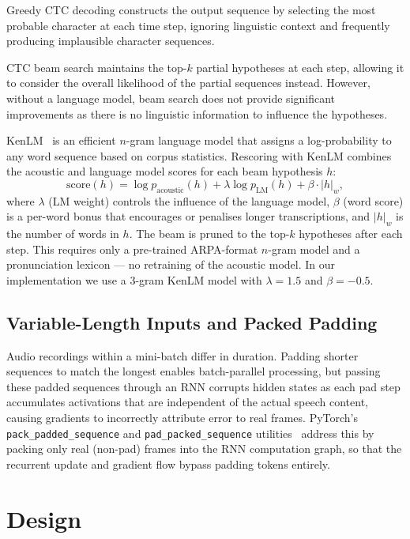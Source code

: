 \documentclass{article}
\begin{document}
Greedy CTC decoding constructs the output sequence by selecting the most probable character at each time step, ignoring linguistic context and frequently producing implausible character sequences.

CTC beam search maintains the top-$k$ partial hypotheses at each step, allowing it to consider the overall likelihood of the partial sequences instead. However, without a language model, beam search does not provide significant improvements as there is no linguistic information to influence the hypotheses.

KenLM~\cite{heafield-2011-kenlm} is an efficient $n$-gram language model that assigns a log-probability to any word sequence based on corpus statistics. Rescoring with KenLM combines the acoustic and language model scores for each beam hypothesis $h$:
\begin{equation}
    \text{score}(h) = \log p_\text{acoustic}(h) + \lambda \log p_\text{LM}(h) + \beta \cdot |h|_w,
    \label{eq:lm_decode}
\end{equation}
where $\lambda$ (LM weight) controls the influence of the language model, $\beta$ (word score) is a per-word bonus that encourages or penalises longer transcriptions, and $|h|_w$ is the number of words in $h$. The beam is pruned to the top-$k$ hypotheses after each step. This requires only a pre-trained ARPA-format $n$-gram model and a pronunciation lexicon --- no retraining of the acoustic model. In our implementation we use a 3-gram KenLM model with $\lambda = 1.5$ and $\beta = -0.5$.

\subsection{Variable-Length Inputs and Packed Padding}

Audio recordings within a mini-batch differ in duration. Padding shorter sequences to match the longest enables batch-parallel processing, but passing these padded sequences through an RNN corrupts hidden states as each pad step accumulates activations that are independent of the actual speech content, causing gradients to incorrectly attribute error to real frames. PyTorch's \texttt{pack\_padded\_sequence} and \texttt{pad\_packed\_sequence} utilities~\cite{paszke2019pytorch} address this by packing only real (non-pad) frames into the RNN computation graph, so that the recurrent update and gradient flow bypass padding tokens entirely.

\section{Design}
\end{document}
